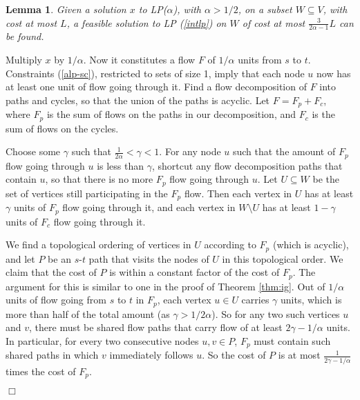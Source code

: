 \documentclass[11pt]{article}
\newcommand{\qed}{\hspace*{\fill}$\Box$}
\newtheorem{lemma}[theorem]{Lemma}
\newenvironment{proof}[1][Proof. ]{\noindent {\bf #1 }}{\qed}
\begin{document}
\begin{lemma} \label{lem:tr}
Given a solution $x$ to LP($\alpha$), with $\alpha>1/2$, on a subset $W\subseteq V$, with cost at most $L$, a feasible solution to LP (\ref{intlp}) on $W$ of cost at most $\frac{3}{2\alpha-1} L$ can be found.
\end{lemma}
\begin{proof}
Multiply $x$ by $1/\alpha$. Now it constitutes a flow $F$ of $1/\alpha$ units from $s$ to $t$. 
Constraints (\ref{alp-sc}), restricted to sets of size 1, imply that each node $u$ now has at 
least one unit of flow going through it. Find a flow decomposition of $F$ into paths and cycles, 
so that the union of the paths is acyclic. Let $F=F_p+F_c$, where $F_p$ is the sum of flows on 
the paths in our decomposition, and $F_c$ is the sum of flows on the cycles. 

Choose some $\gamma$ such that $\frac{1}{2\alpha}<\gamma < 1$. For any node $u$ such that the 
amount of $F_p$ flow going through $u$ is less than $\gamma$, shortcut any flow decomposition 
paths that contain $u$, so that there is no more $F_p$ flow going through $u$. Let $U\subseteq W$ 
be the set of vertices still participating in the $F_p$ flow. Then each vertex in $U$ has at least 
$\gamma$ units of $F_p$ flow going through it, and each vertex in $W\setminus U$ has at least 
$1-\gamma$ units of $F_c$ flow going through it.  

We find a topological ordering of vertices in $U$ according to $F_p$ (which is acyclic), and 
let $P$ be an $s$-$t$ path that visits the nodes of $U$ in this topological order. We claim 
that the cost of $P$ is within a constant factor of the cost of $F_p$.
The argument for this is similar to one in the proof of Theorem \ref{thm:ig}.
Out of $1/\alpha$ units of flow 
going from $s$ to $t$ in $F_p$, each vertex $u\in U$ carries $\gamma$ units, which is more than half of the total amount 
(as $\gamma>1/2\alpha$). So for any two such vertices $u$ and $v$, there must be shared flow paths that carry flow of at least $2\gamma-1/\alpha$ units. 
In particular, for every 
two consecutive nodes $u,v\in P$, $F_p$ must contain such shared paths in which $v$ immediately follows $u$.  So the cost of $P$ is at most $\frac{1}{2\gamma-1/\alpha}$ times the cost of $F_p$.


\end{proof}
\end{document}
